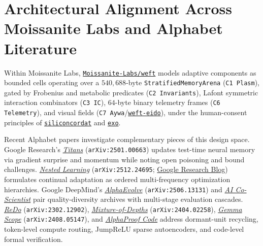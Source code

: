 \documentclass[10pt,a4paper]{article}
\begin{document}
\section{Architectural Alignment Across Moissanite Labs and Alphabet Literature}

Within Moissanite Labs, \href{https://github.com/Moissanite-Labs/weft}{\texttt{Moissanite-Labs/weft}} models adaptive components as bounded cells operating over a $540{,}688$-byte \texttt{StratifiedMemoryArena} (\texttt{C1 Plasm}), gated by Frobenius and metabolic predicates (\texttt{C2 Invariants}), Lafont symmetric interaction combinators (\texttt{C3 IC}), $64$-byte binary telemetry frames (\texttt{C6 Telemetry}), and visual fields (\texttt{C7 Aywa}/\href{https://github.com/Moissanite-Labs/weft-eido}{\texttt{weft-eido}}), under the human-consent principles of \href{https://github.com/Moissanite-Labs/siliconcordat}{\texttt{siliconcordat}} and \href{https://github.com/Moissanite-Labs/exo}{\texttt{exo}}.

Recent Alphabet papers investigate complementary pieces of this design space. Google Research's \href{https://arxiv.org/abs/2501.00663}{\emph{Titans}} (\texttt{arXiv:2501.00663}) updates test-time neural memory via gradient surprise and momentum while noting open poisoning and bound challenges. \href{https://arxiv.org/abs/2512.24695}{\emph{Nested Learning}} (\texttt{arXiv:2512.24695}; \href{https://research.google/blog/introducing-nested-learning-a-new-ml-paradigm-for-continual-learning/}{Google Research Blog}) formulates continual adaptation as ordered multi-frequency optimization hierarchies. Google DeepMind's \href{https://arxiv.org/abs/2506.13131}{\emph{AlphaEvolve}} (\texttt{arXiv:2506.13131}) and \href{https://research.google/blog/accelerating-scientific-breakthroughs-with-an-ai-co-scientist/}{\emph{AI Co-Scientist}} pair quality-diversity archives with multi-stage evaluation cascades. \href{https://arxiv.org/abs/2302.12902}{\emph{ReDo}} (\texttt{arXiv:2302.12902}), \href{https://arxiv.org/abs/2404.02258}{\emph{Mixture-of-Depths}} (\texttt{arXiv:2404.02258}), \href{https://arxiv.org/abs/2408.05147}{\emph{Gemma Scope}} (\texttt{arXiv:2408.05147}), and \href{https://deepmind.google/blog/introducing-alphaproof-code/}{\emph{AlphaProof Code}} address dormant-unit recycling, token-level compute routing, JumpReLU sparse autoencoders, and code-level formal verification.
\end{document}
